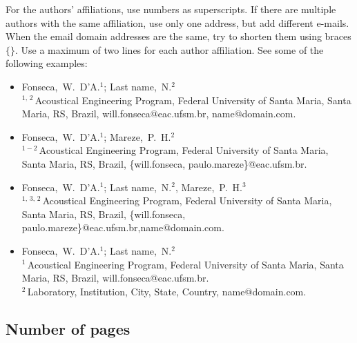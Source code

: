 \documentclass[12pt, a4paper, twoside, twocolumn]{article}
\begin{document}
For the authors' affiliations, use numbers as superscripts. If there are multiple authors with the same affiliation, use only one address, but add different e-mails. When the email domain addresses are the same, try to shorten them using braces $\{ \}$. Use a maximum of two lines for each author affiliation. See some of the following examples:
%
\begin{flushleft}
\vspace{-0.5\baselineskip}
\begin{itemize}[topsep=-1ex,align=left,leftmargin=0.2cm] \itemsep=4pt

	\item Fonseca,~W.~D'A.$^1$; Last name,~N.$^2$\\[6pt]	
	$^{1,\,2}$\,Acoustical Engineering Program, Federal University of Santa Maria, Santa Maria, RS, Brazil, 
	 will.fonseca@eac.ufsm.br, name@domain.com.
	
	\item Fonseca,~W.~D'A.$^1$; Mareze,~P.~H.$^2$\\[6pt]	
	$^{1-2}$\,Acoustical Engineering Program, Federal University of Santa Maria, Santa Maria, RS, Brazil,
	\{will.fonseca, paulo.mareze\}@eac.ufsm.br.
	
	\item Fonseca,~W.~D'A.$^1$; Last name,~N.$^2$, Mareze,~P.~H.$^3$\\[6pt]	
	$^{1,\,3,\,2}$\,Acoustical Engineering Program, Federal University of Santa Maria, Santa Maria, RS, Brazil,
	\{will.fonseca, paulo.mareze\}@eac.ufsm.br,\linebreak name@domain.com.

	\item Fonseca,~W.~D'A.$^1$; Last name,~N.$^2$\\[6pt]	
	$^{1}$\,Acoustical Engineering Program, Federal University of Santa Maria, Santa Maria, RS, Brazil,
	will.fonseca@eac.ufsm.br.\\[4pt]		
	$^2$\,Laboratory, Institution, City, State, Country, name@domain.com.	
\end{itemize}
\vspace{-0.4\baselineskip}
\end{flushleft}

\subsection{Number of pages}
\end{document}
